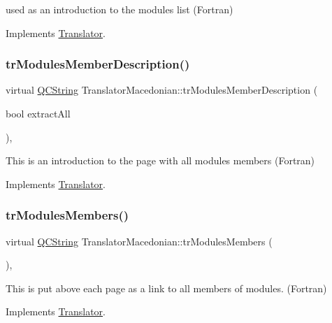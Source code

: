 used as an introduction to the modules list (Fortran) 

Implements \mbox{\hyperlink{class_translator}{Translator}}.

\mbox{\label{class_translator_macedonian_a1152de047c797cd809be845051d8b1cb}} 
\subsubsection{\texorpdfstring{trModulesMemberDescription()}{trModulesMemberDescription()}}
{\footnotesize\ttfamily virtual \mbox{\hyperlink{class_q_c_string}{Q\+C\+String}} Translator\+Macedonian\+::tr\+Modules\+Member\+Description (\begin{DoxyParamCaption}\item[{bool}]{extract\+All }\end{DoxyParamCaption})\hspace{0.3cm}{\ttfamily [inline]}, {\ttfamily [virtual]}}

This is an introduction to the page with all modules members (Fortran) 

Implements \mbox{\hyperlink{class_translator}{Translator}}.

\mbox{\label{class_translator_macedonian_ac031601f60e865efd155821db72aa8cf}} 
\subsubsection{\texorpdfstring{trModulesMembers()}{trModulesMembers()}}
{\footnotesize\ttfamily virtual \mbox{\hyperlink{class_q_c_string}{Q\+C\+String}} Translator\+Macedonian\+::tr\+Modules\+Members (\begin{DoxyParamCaption}{ }\end{DoxyParamCaption})\hspace{0.3cm}{\ttfamily [inline]}, {\ttfamily [virtual]}}

This is put above each page as a link to all members of modules. (Fortran) 

Implements \mbox{\hyperlink{class_translator}{Translator}}.

